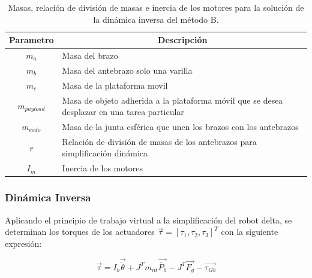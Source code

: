         \begingroup
            \renewcommand{\arraystretch}{1.5}
            \begin{table}[H]
            \centering
            \begin{tabular}{c m{12cm}}
               \hline
               \textbf{Parametro}  & \multicolumn{1}{c}{\textbf{Descripción}}  \\
               \hline           \hline            
            $m_{a}$ & Masa del brazo\\
            \hline
            $m_{b}$ & Masa del antebrazo solo una varilla\\
            \hline
            $m_{c}$ & Masa de la plataforma movil\\
            \hline
            $m_{payload}$ & Masa de objeto adherida a la plataforma móvil que se desea desplazar en una tarea particular\\
            \hline
            $m_{codo}$ & Masa de la junta esférica que unen los brazos con los antebrazos\\
            \hline
            $r$ & Relación de división de masas de los antebrazos para simplificación dinámica\\
            \hline
            $I_{m}$ & Inercia de los motores\\
            \hline
            \end{tabular}
            \caption{Masas, relación de división de masas e inercia de los motores para la solución de la dinámica inversa del método B.}
           \label{tab:cap4_tabla_13333}
        \end{table}
        \endgroup 
\newpage


        \subsubsection{Dinámica Inversa}

        Aplicando el principio de trabajo virtual a la simplificación del robot delta, se determinan los torques de los actuadores  $ \overrightarrow{ \tau}= \left[  \tau_{1}, \tau_{2}, \tau_{3} \right] ^{T} $  con la siguiente expresión:
        
        \begin{equation}
             \overrightarrow{ \tau}=I_{b} \overrightarrow{\ddot{ \theta }}+J^{T}m_{nt} \overrightarrow{\ddot{P_{0}}}- J^{T}\overrightarrow{F_{g}}-\overrightarrow{ \tau_{Gb}} 
            \label{eq:cap4_MB_23}
        \end{equation}
        
